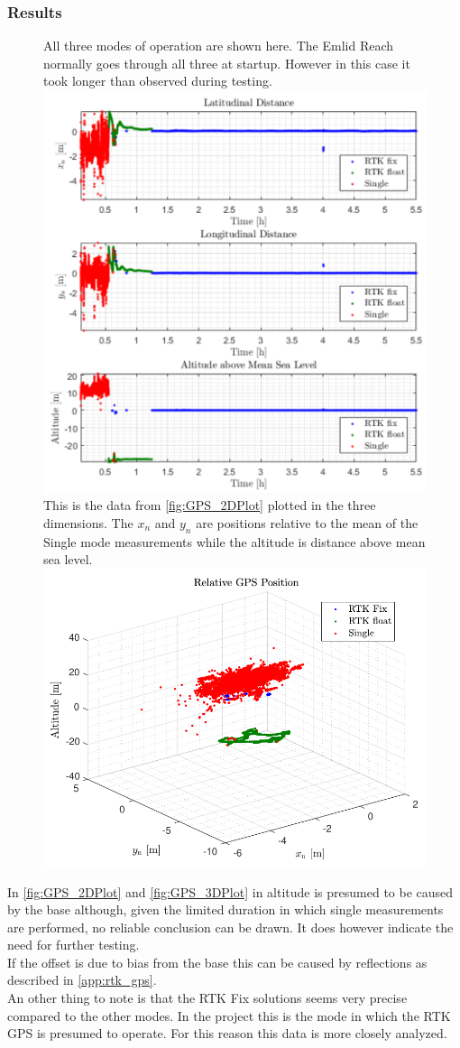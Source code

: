 \subsubsection*{Results}

\begin{figure}[H]
  \captionbox
  {
    All three modes of operation are shown here. The Emlid Reach normally goes through all three at startup. However in this case it took longer than observed during testing.
    \label{fig:GPS_2DPlot}
  }
  {
    \includegraphics[width=.45\textwidth]{figures/GPS_2DPlot}
  }
  \hspace{5pt}
  \captionbox
  {
    This is the data from \autoref{fig:GPS_2DPlot} plotted in the three dimensions. The $x_n$ and $y_n$ are positions relative to the mean of the Single mode measurements while the altitude is distance above mean sea level.
    \label{fig:GPS_3DPlot}
  }
  {
    \includegraphics[width=.45\textwidth]{figures/GPS_3DPlot}
    \vspace{1cm}
  }
\end{figure}

In \autoref{fig:GPS_2DPlot} and \autoref{fig:GPS_3DPlot} in altitude is presumed to be caused by the base although, given the limited duration in which single measurements are performed, no reliable conclusion can be drawn. It does however indicate the need for further testing.\\
If the offset is due to bias from the base this can be caused by reflections as described in \ref{app:rtk_gps}.\\
An other thing to note is that the RTK Fix solutions seems very precise compared to the other modes. In the project this is the mode in which the RTK GPS is presumed to operate. For this reason this data is more closely analyzed.

